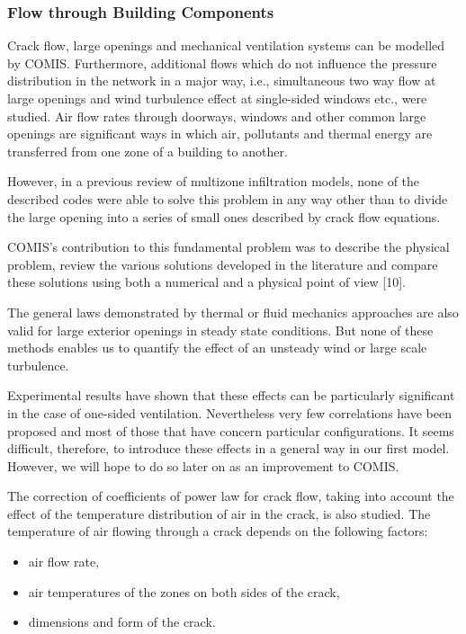 \documentclass[10pt]{article}
\begin{document}
\subsubsection{Flow through Building Components}
Crack flow, large openings and mechanical ventilation systems can be modelled by COMIS. Furthermore, additional flows which do not influence the pressure distribution in the network in a major way, i.e., simultaneous two way flow at large openings and wind turbulence effect at single-sided windows etc., were studied. Air flow rates through doorways, windows and other common large openings are significant ways in which air, pollutants and thermal energy are transferred from one zone of a building to another.

However, in a previous review of multizone infiltration models, none of the described codes were able to solve this problem in any way other than to divide the large opening into a series of small ones described by crack flow equations.

COMIS's contribution to this fundamental problem was to describe the physical problem, review the various solutions developed in the literature and compare these solutions using both a numerical and a physical point of view [10].

The general laws demonstrated by thermal or fluid mechanics approaches are also valid for large exterior openings in steady state conditions. But none of these methods enables us to quantify the effect of an unsteady wind or large scale turbulence.

Experimental results have shown that these effects can be particularly significant in the case of one-sided ventilation. Nevertheless very few correlations have been proposed and most of those that have concern particular configurations. It seems difficult, therefore, to introduce these effects in a general way in our first model. However, we will hope to do so later on as an improvement to COMIS.

The correction of coefficients of power law for crack flow, taking into account the effect of the temperature distribution of air in the crack, is also studied. The temperature of air flowing through a crack depends on the following factors: 

\begin{itemize}
\item air flow rate,
\item air temperatures of the zones on both sides of the crack,
\item dimensions and form of the crack.
\end{itemize}
\end{document}
